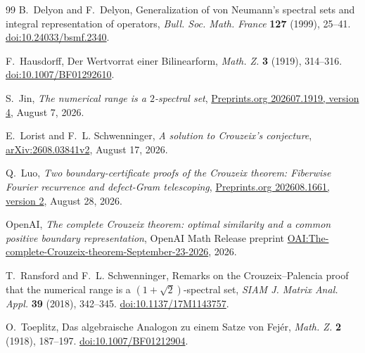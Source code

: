 \begin{thebibliography}{99}
B.~Delyon and F.~Delyon,
Generalization of von Neumann's spectral sets and integral representation of operators,
\emph{Bull. Soc. Math. France} \textbf{127} (1999), 25--41.
\href{https://doi.org/10.24033/bsmf.2340}{doi:10.24033/bsmf.2340}.

F.~Hausdorff, Der Wertvorrat einer Bilinearform,
\emph{Math. Z.} \textbf{3} (1919), 314--316.
\href{https://doi.org/10.1007/BF01292610}{doi:10.1007/BF01292610}.

S.~Jin, \emph{The numerical range is a $2$-spectral set},
\href{https://www.preprints.org/manuscript/202607.1919/v4}{Preprints.org 202607.1919, version 4},
August 7, 2026.

E.~Lorist and F.~L. Schwenninger,
\emph{A solution to Crouzeix's conjecture},
\href{https://arxiv.org/abs/2608.03841v2}{arXiv:2608.03841v2}, August 17, 2026.

Q.~Luo, \emph{Two boundary-certificate proofs of the Crouzeix theorem:
Fiberwise Fourier recurrence and defect-Gram telescoping},
\href{https://www.preprints.org/manuscript/202608.1661/v2}{Preprints.org 202608.1661, version 2},
August 28, 2026.

OpenAI, \emph{The complete Crouzeix theorem: optimal similarity and a
common positive boundary representation},
OpenAI Math Release preprint
\href{https://github.com/openai/math/blob/main/preprints/The-complete-Crouzeix-theorem-September-23-2026/paper.pdf}{OAI:The-complete-Crouzeix-theorem-September-23-2026},
2026.

T.~Ransford and F.~L. Schwenninger,
Remarks on the Crouzeix--Palencia proof that the numerical range is a
$(1+\sqrt{2})$-spectral set,
\emph{SIAM J. Matrix Anal. Appl.} \textbf{39} (2018), 342--345.
\href{https://doi.org/10.1137/17M1143757}{doi:10.1137/17M1143757}.

O.~Toeplitz, Das algebraische Analogon zu einem Satze von Fej{\'e}r,
\emph{Math. Z.} \textbf{2} (1918), 187--197.
\href{https://doi.org/10.1007/BF01212904}{doi:10.1007/BF01212904}.

\end{thebibliography}
